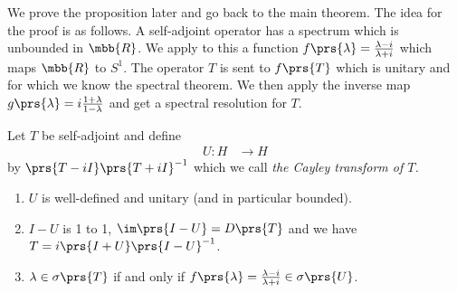 \documentclass[10pt, twoside]{book}
\begin{document}
We prove the proposition later and go back to the main theorem. The idea for the proof is as follows.
A self-adjoint operator has a spectrum which is unbounded in $\mbb{R}$. We apply to this a function $f\prs{\lambda} = \frac{\lambda - i}{\lambda + i}$ which maps $\mbb{R}$ to $S^1$. The operator $T$ is sent to $f\prs{T}$ which is unitary and for which we know the spectral theorem. We then apply the inverse map $g\prs{\lambda} = i \frac{1+\lambda}{1-\lambda}$ and get a spectral resolution for $T$.

\begin{definition}
Let $T$ be self-adjoint and define
\begin{align*}
U \colon H &\to H
\end{align*}
by $\prs{T - iI}\prs{T + iI}^{-1}$ which we call \emph{the Cayley transform of $T$.}
\end{definition}

\begin{proposition}
\begin{enumerate}
\item $U$ is well-defined and unitary (and in particular bounded).
\item $I-U$ is 1 to 1, $\im\prs{I -U}=D\prs{T}$ and we have $T = i\prs{I+U}\prs{I-U}^{-1}$.
\item $\lambda \in \sigma\prs{T}$ if and only if $f\prs{\lambda} = \frac{\lambda - i}{\lambda + i} \in \sigma\prs{U}$.
\end{enumerate}
\end{proposition}
\end{document}
